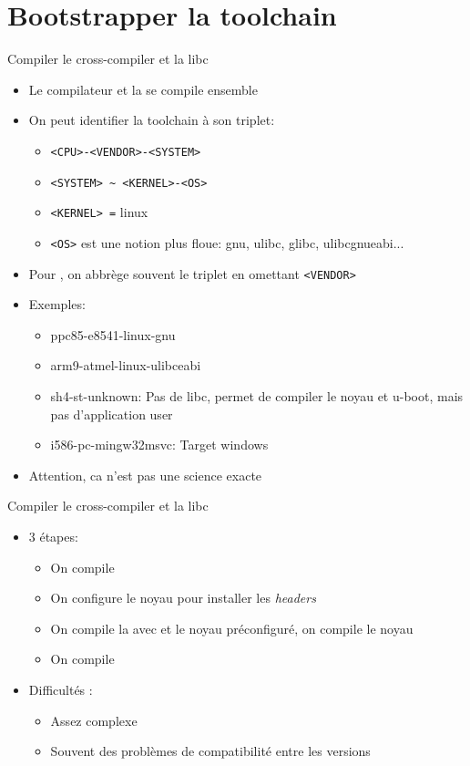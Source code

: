 \section{Bootstrapper la toolchain}

\begin{frame}[fragile=singleslide]{Compiler le cross-compiler et la libc}
  \begin{itemize}
  \item Le compilateur et la  se compile ensemble
  \item On peut identifier la toolchain à son triplet:
    \begin{itemize}
    \item \verb+<CPU>-<VENDOR>-<SYSTEM>+
    \item \verb+<SYSTEM> ~ <KERNEL>-<OS>+
    \item \verb+<KERNEL> =+ linux
    \item \verb+<OS>+  est une notion  plus floue: gnu,  ulibc, glibc,
      ulibcgnueabi...
    \end{itemize}
  \item  Pour ,  on abbrège  souvent le  triplet  en omettant
    \verb+<VENDOR>+
  \item Exemples:
    \begin{itemize}
    \item ppc85-e8541-linux-gnu %
    \item arm9-atmel-linux-ulibceabi %
    \item sh4-st-unknown: Pas de libc, permet de compiler le noyau
      et u-boot, mais pas d'application user
    \item i586-pc-mingw32msvc: Target windows
    \end{itemize}
  \item Attention, ca n'est pas une science exacte
  \end{itemize}
\end{frame}

\begin{frame}[fragile=singleslide]{Compiler le cross-compiler et la libc}
  \begin{itemize}
  \item 3 étapes:
    \begin{itemize}
    \item On compile 
    \item On configure le noyau pour installer les \emph{headers}
    \item On  compile la   avec   et le
      noyau préconfiguré, on compile le noyau
    \item On compile 
    \end{itemize}
  \item Difficultés :
    \begin{itemize}
    \item Assez complexe
    \item Souvent des problèmes de compatibilité entre les versions
    \end{itemize}
  \end{itemize}
\end{frame}

